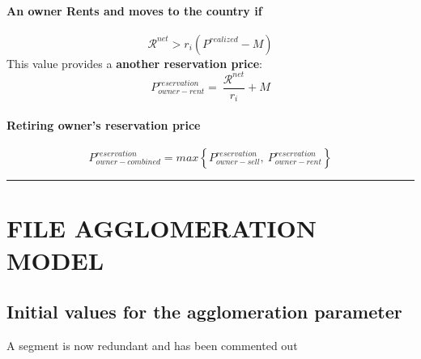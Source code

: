 \subsubsection{An owner Rents and moves to the country if} 
\[\mathcal{R}^{net}>r_i(P^{realized}-M)\]
This value provides a \textbf{another reservation price}: 
\[P_{owner-rent}^{reservation} =\ \frac{\mathcal{R}^{net}}{r_i}+M \]

\subsubsection{Retiring owner's reservation price}
\[P_{owner-combined}^{reservation}= max\left\{ P_{owner-sell}^{reservation} ,\ P_{owner-rent}^{reservation}\right\}\]

\hrule


\chapter{FILE AGGLOMERATION MODEL}

\renewcommand{\sfdefault}{phv}

\section{Initial values for  the agglomeration parameter}
A segment is now redundant and has been commented out










